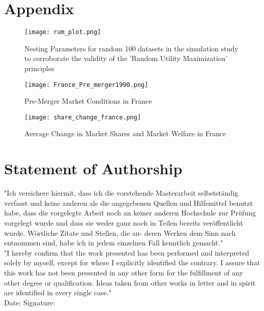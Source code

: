 \documentclass[a4paper,11pt]{article}
\begin{document}
\printbibliography

\clearpage
{}
\setcounter{page}{1}

\section{Appendix}
\label{sec:Appendix}

    \begin{figure}[htb]
        \centering
        \texttt{[image: rum\_plot.png]}
        \caption{Nesting Parameters for random 100 datasets in the simulation study to corroborate the validity of the 'Random Utility Maximization' principles}
        \label{fig:RUM}
    \end{figure}

    \begin{figure}[htb]
        \centering
        \texttt{[image: France\_Pre\_merger1990.png]}
        \caption{Pre-Merger Market Conditions in France}
        \label{fig:France: Pre-Merger}
    \end{figure}

    \begin{figure}[htb]
        \centering
        \texttt{[image: share\_change\_france.png]}
        \caption{Average Change in Market Shares and Market Welfare in France}
        \label{fig: Avg Change}
    \end{figure}

\clearpage

\section{Statement of Authorship}
\label{sec:Statement}

"Ich versichere hiermit, dass ich die vorstehende Masterarbeit selbstständig verfasst und keine anderen als die angegebenen Quellen und Hilfsmittel benutzt habe, dass die vorgelegte Arbeit noch an keiner anderen Hochschule zur Prüfung vorgelegt wurde und dass sie weder ganz noch in Teilen bereits veröffentlicht wurde. Wörtliche Zitate und Stellen, die an- deren Werken dem Sinn nach entnommen sind, habe ich in jedem einzelnen Fall kenntlich gemacht."\\

"I hereby confirm that the work presented has been performed and interpreted solely by myself, except for where I explicitly identified the contrary. I assure that this work has not been presented in any other form for the fulfillment of any other degree or qualification. Ideas taken from other works in letter and in spirit are identified in every single case."\\

\vspace{2cm} %
Date: \underline{\hspace{3cm}} \hfill Signature: \underline{\hspace{5cm}}

    
    
\end{document}
